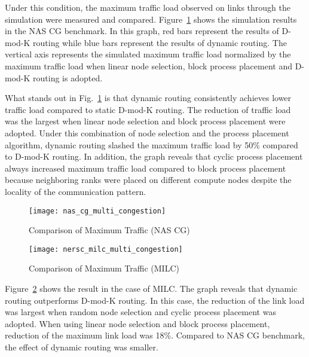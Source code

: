 Under this condition, the maximum traffic load observed on links through the
simulation were measured and compared.
Figure~\ref{fig:nas-cg-multi-congestion} shows the simulation results in
the NAS CG benchmark. In this graph, red bars represent the results of
\mbox{D-mod-K} routing while blue bars represent the results of dynamic
routing. The vertical axis represents the simulated maximum traffic load
normalized by the maximum traffic load when linear node selection, block
process placement and \mbox{D-mod-K} routing is adopted.

What stands out in Fig.~\ref{fig:nas-cg-multi-congestion} is that
dynamic routing consistently achieves lower traffic load compared to
static \mbox{D-mod-K} routing. The reduction of traffic load was the largest
when linear node selection and block process placement were adopted. Under
this combination of node selection and the process placement algorithm,
dynamic routing slashed the maximum traffic load by 50\% compared to
\mbox{D-mod-K} routing. In addition, the graph reveals that cyclic process
placement always increased maximum traffic load compared to block process
placement because neighboring ranks were placed on different compute nodes
despite the locality of the communication pattern.

\begin{figure}
    \centering
    \texttt{[image: nas\_cg\_multi\_congestion]}
    \caption{Comparison of Maximum Traffic (NAS CG)}%
    \label{fig:nas-cg-multi-congestion}
\end{figure}

\begin{figure}
    \centering
    \texttt{[image: nersc\_milc\_multi\_congestion]}
    \caption{Comparison of Maximum Traffic (MILC)}%
    \label{fig:nersc-milc-multi-congestion}
\end{figure}

Figure~\ref{fig:nersc-milc-multi-congestion} shows the result in the
case of MILC\@. The graph reveals that dynamic routing outperforms
\mbox{D-mod-K} routing. In this case, the reduction of the link load was
largest when random node selection and cyclic process placement was
adopted. When using linear node selection and block process placement,
reduction of the maximum link load was 18\%. Compared to NAS CG benchmark, the
effect of dynamic routing was smaller.

